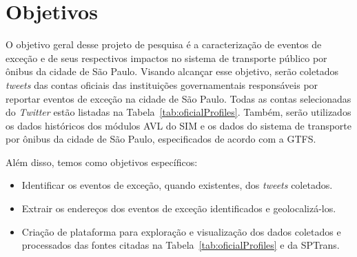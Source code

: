 \documentclass[
	12pt,				%
	oneside,			%
	a4paper,			%
	english,			%
	brazil				%
	]{abntex2ppgsi}
\begin{document}
{\section{Objetivos}
\label{objetivos}
O objetivo geral desse projeto de pesquisa é a caracterização de eventos de exceção e de seus respectivos impactos no sistema de transporte público por ônibus da cidade de São Paulo. Visando alcançar esse objetivo, serão coletados \textit{tweets} das contas oficiais das instituições governamentais responsáveis por reportar eventos de exceção na
cidade de São Paulo. Todas as contas selecionadas do \textit{Twitter} estão listadas na Tabela~\ref{tab:oficialProfiles}. Também, serão utilizados os dados históricos dos módulos AVL do SIM e os dados do sistema de transporte por ônibus da cidade de São Paulo, especificados de acordo com a GTFS. 

Além disso, temos como objetivos específicos:

\begin{itemize}
    \item Identificar os eventos de exceção, quando existentes, dos \textit{tweets} coletados.
     \item Extrair os endereços dos eventos de exceção identificados e geolocalizá-los.
\item Criação de plataforma para exploração e visualização dos dados coletados e processados das fontes citadas na Tabela~\ref{tab:oficialProfiles} e da SPTrans.
\end{itemize}

}
\end{document}

